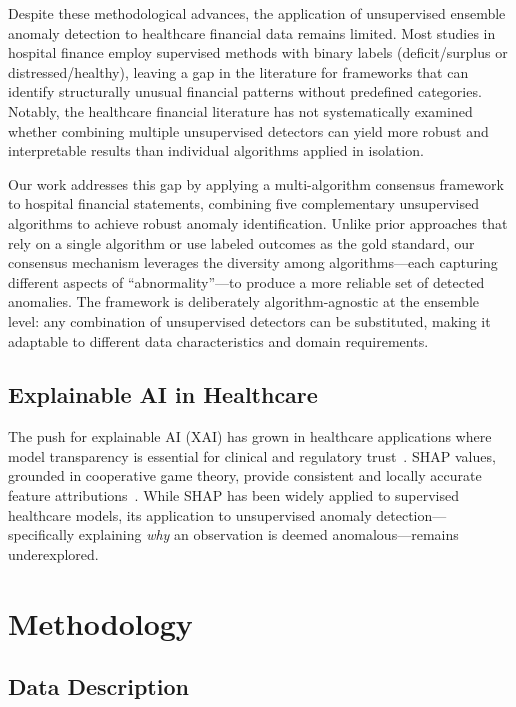 \documentclass{ieeeaccess}
\begin{document}
Despite these methodological advances, the application of unsupervised ensemble anomaly detection to healthcare financial data remains limited. Most studies in hospital finance employ supervised methods with binary labels (deficit/surplus or distressed/healthy), leaving a gap in the literature for frameworks that can identify structurally unusual financial patterns without predefined categories. Notably, the healthcare financial literature has not systematically examined whether combining multiple unsupervised detectors can yield more robust and interpretable results than individual algorithms applied in isolation.

Our work addresses this gap by applying a multi-algorithm consensus framework to hospital financial statements, combining five complementary unsupervised algorithms to achieve robust anomaly identification. Unlike prior approaches that rely on a single algorithm or use labeled outcomes as the gold standard, our consensus mechanism leverages the diversity among algorithms---each capturing different aspects of ``abnormality''---to produce a more reliable set of detected anomalies. The framework is deliberately algorithm-agnostic at the ensemble level: any combination of unsupervised detectors can be substituted, making it adaptable to different data characteristics and domain requirements.

\subsection{Explainable AI in Healthcare}
\label{subsec:xai}
The push for explainable AI (XAI) has grown in healthcare applications where model transparency is essential for clinical and regulatory trust~\cite{arrieta2020explainable}. SHAP values, grounded in cooperative game theory, provide consistent and locally accurate feature attributions~\cite{lundberg2017unified}. While SHAP has been widely applied to supervised healthcare models, its application to unsupervised anomaly detection---specifically explaining \textit{why} an observation is deemed anomalous---remains underexplored.

\section{Methodology}
\label{sec:method}

\subsection{Data Description}
\label{subsec:data}
\end{document}
